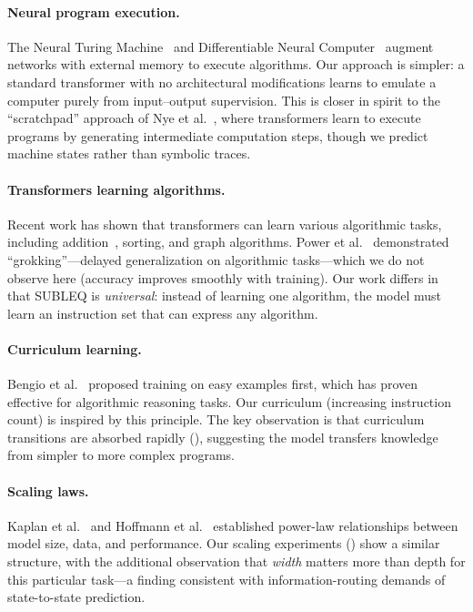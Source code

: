\documentclass[11pt,a4paper]{article}
\begin{document}
\paragraph{Neural program execution.}
The Neural Turing Machine~\cite{graves2014ntm} and Differentiable Neural Computer~\cite{graves2016dnc} augment networks with external memory to execute algorithms.
Our approach is simpler: a standard transformer with no architectural modifications learns to emulate a computer purely from input--output supervision.
This is closer in spirit to the ``scratchpad'' approach of Nye et al.~\cite{nye2021scratchpad}, where transformers learn to execute programs by generating intermediate computation steps, though we predict machine states rather than symbolic traces.

\paragraph{Transformers learning algorithms.}
Recent work has shown that transformers can learn various algorithmic tasks, including addition~\cite{lee2024teaching}, sorting, and graph algorithms.
Power et al.~\cite{power2022grokking} demonstrated ``grokking''---delayed generalization on algorithmic tasks---which we do not observe here (accuracy improves smoothly with training).
Our work differs in that SUBLEQ is \emph{universal}: instead of learning one algorithm, the model must learn an instruction set that can express any algorithm.

\paragraph{Curriculum learning.}
Bengio et al.~\cite{bengio2009curriculum} proposed training on easy examples first, which has proven effective for algorithmic reasoning tasks.
Our curriculum (increasing instruction count) is inspired by this principle.
The key observation is that curriculum transitions are absorbed rapidly (), suggesting the model transfers knowledge from simpler to more complex programs.

\paragraph{Scaling laws.}
Kaplan et al.~\cite{kaplan2020scaling} and Hoffmann et al.~\cite{hoffmann2022chinchilla} established power-law relationships between model size, data, and performance.
Our scaling experiments () show a similar structure, with the additional observation that \emph{width} matters more than depth for this particular task---a finding consistent with information-routing demands of state-to-state prediction.
\end{document}

